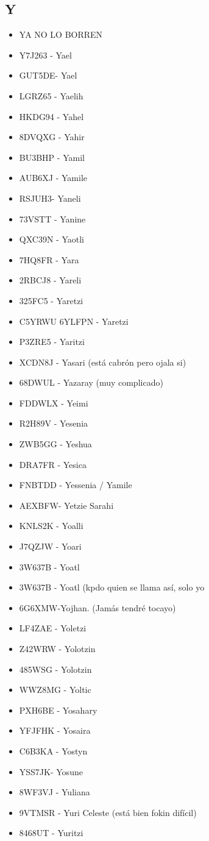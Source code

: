 \subsection*{Y}
\begin{itemize}[leftmargin=*,nosep]
\item YA NO LO BORREN
\item Y7J263 - Yael
\item GUT5DE- Yael
\item LGRZ65 - Yaelih
\item HKDG94 - Yahel
\item 8DVQXG - Yahir
\item BU3BHP - Yamil
\item AUB6XJ - Yamile
\item RSJUH3- Yaneli
\item 73VSTT - Yanine
\item QXC39N - Yaotli
\item 7HQ8FR - Yara
\item 2RBCJ8 - Yareli
\item 325FC5 - Yaretzi
\item C5YRWU 6YLFPN - Yaretzi
\item P3ZRE5 - Yaritzi
\item XCDN8J - Yasari (está cabrón pero ojala si)
\item 68DWUL - Yazaray (muy complicado)
\item FDDWLX - Yeimi
\item R2H89V - Yesenia
\item ZWB5GG - Yeshua
\item DRA7FR - Yesica
\item FNBTDD - Yessenia  / Yamile
\item AEXBFW-  Yetzie Sarahi
\item KNLS2K - Yoalli
\item J7QZJW  - Yoari
\item 3W637B - Yoatl
\item 3W637B - Yoatl (kpdo quien se llama así, solo yo
\item 6G6XMW-Yojhan.    (Jamás tendré tocayo)
\item LF4ZAE - Yoletzi
\item Z42WRW - Yolotzin
\item 485WSG - Yolotzin
\item WWZ8MG - Yoltic
\item PXH6BE - Yosahary
\item YFJFHK - Yosaira
\item C6B3KA - Yostyn
\item YSS7JK- Yosune
\item 8WF3VJ - Yuliana
\item 9VTMSR - Yuri Celeste (está bien fokin difícil)
\item 8468UT - Yuritzi
\end{itemize}

